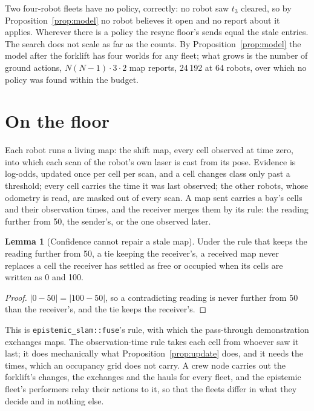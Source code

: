 \documentclass[11pt,a4paper]{article}
\theoremstyle{definition}
\newtheorem{lemma}{Lemma}
\newcommand{\code}[1]{\texttt{\small #1}}
\begin{document}
Two four-robot fleets have no policy, correctly: no robot saw $t_3$ cleared, so by
Proposition~\ref{prop:model} no robot believes it open and no report about it
applies. Wherever there is a policy the resync floor's sends equal the stale
entries. The search does not scale as far as the counts. By
Proposition~\ref{prop:model} the model after the forklift has four worlds for any
fleet; what grows is the number of ground actions, $N(N-1)\cdot 3 \cdot 2$ map
reports, 24\,192 at 64 robots, over which no policy was found within the budget.

\section{On the floor}
\label{sec:runtime}

Each robot runs a living map: the shift map, every cell observed at time zero,
into which each scan of the robot's own laser is cast from its pose. Evidence is
log-odds, updated once per cell per scan, and a cell changes class only past a
threshold; every cell carries the time it was last observed; the other robots,
whose odometry is read, are masked out of every scan. A map sent carries a
bay's cells and their observation times, and the receiver merges them by its
rule: the reading further from 50, the sender's, or the one observed later.

\begin{lemma}[Confidence cannot repair a stale map]
\label{lem:tie}
Under the rule that keeps the reading further from 50, a tie keeping the
receiver's, a received map never replaces a cell the receiver has settled as free
or occupied when its cells are written as 0 and 100.
\end{lemma}

\begin{proof}
$|0 - 50| = |100 - 50|$, so a contradicting reading is never further from 50 than
the receiver's, and the tie keeps the receiver's.
\end{proof}

\noindent
This is \code{epistemic\_slam::fuse}'s rule, with which the pass-through
demonstration exchanges maps. The observation-time rule takes each cell from
whoever saw it last; it does mechanically what Proposition~\ref{prop:update}
does, and it needs the times, which an occupancy grid does not carry. A crew node
carries out the forklift's changes, the exchanges and the hauls for every fleet,
and the epistemic fleet's performers relay their actions to it, so that the
fleets differ in what they decide and in nothing else.
\end{document}
